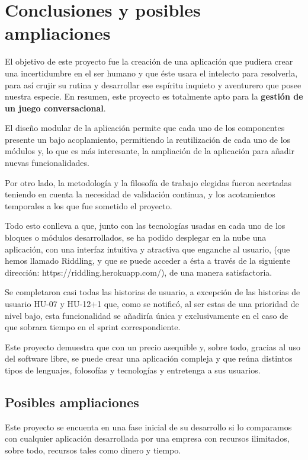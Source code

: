 \chapter{Conclusiones y posibles ampliaciones}

El objetivo de este proyecto fue la creación de una aplicación que pudiera crear una incertidumbre en el ser humano y que éste usara el intelecto para resolverla, para así crujir su rutina y desarrollar ese espíritu inquieto y aventurero que posee nuestra especie. En resumen, este proyecto es totalmente apto para la \textbf{gestión de un juego conversacional}. 

El diseño modular de la aplicación permite que cada uno de los componentes presente un bajo acoplamiento, permitiendo la reutilización de cada uno de los módulos y, lo que es más interesante, la ampliación de la aplicación para añadir nuevas funcionalidades. 

Por otro lado, la metodología y la filosofía de trabajo elegidas fueron acertadas teniendo en cuenta la necesidad de validación continua, y los acotamientos temporales a los que fue sometido el proyecto.

Todo esto conlleva a que, junto con las tecnologías usadas en cada uno de los bloques o módulos desarrollados, se ha podido desplegar en la nube una aplicación, con una interfaz intuitiva y atractiva que enganche al usuario, (que hemos llamado Riddling, y que se puede acceder a ésta a través de la siguiente dirección: https://riddling.herokuapp.com/), de una manera satisfactoria.

Se completaron casi todas las historias de usuario, a excepción de las historias de usuario HU-07 y HU-12+1 que, como se notificó, al ser estas de una prioridad de nivel bajo, esta funcionalidad se añadiría única y exclusivamente en el caso de que sobrara tiempo en el sprint correspondiente.

Este proyecto demuestra que con un precio asequible y, sobre todo, gracias al uso del software libre, se puede crear una aplicación compleja y que reúna distintos tipos de lenguajes, folosofías y tecnologías y entretenga a sus usuarios.

\section{Posibles ampliaciones}

Este proyecto se encuenta en una fase inicial de su desarrollo si lo comparamos con cualquier aplicación desarrollada por una empresa con recursos ilimitados, sobre todo, recursos tales como dinero y tiempo.

